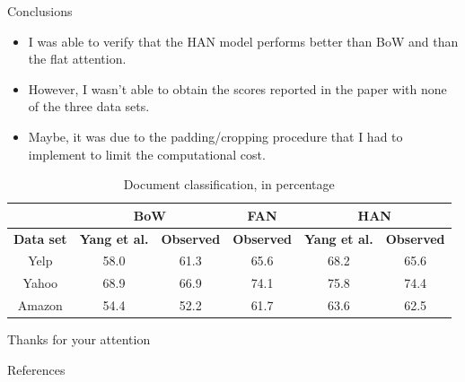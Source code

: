 \documentclass[10pt]{beamer}
\begin{document}
\begin{frame}{Conclusions}

\begin{itemize}
\item
I was able to verify that the HAN model performs better than BoW and than the flat attention.
\item
However, I wasn't able to obtain the scores reported in the paper with none of the three data sets.
\item
Maybe, it was due to the padding/cropping procedure that I had to implement to limit the computational cost.
\end{itemize}

\footnotesize{

\begin{table}[]
\begin{tabular}{c|c|c|c|c|c|}
\cline{2-6}
                       & \multicolumn{2}{c|}{\textbf{BoW}} & \textbf{FAN} & \multicolumn{2}{c|}{\textbf{HAN}} \\
\hline
\multicolumn{1}{|c|}{\textbf{Data set}} & \textbf{Yang et al. \cite{yang2016hierarchical}} & \textbf{Observed} & \textbf{Observed} & \textbf{Yang et al. \cite{yang2016hierarchical}} & \textbf{Observed} \\
\hline
\multicolumn{1}{|c|}{Yelp} & 58.0 & 61.3 & 65.6 & 68.2 & 65.6 \\
\hline
\multicolumn{1}{|c|}{Yahoo} & 68.9 & 66.9 & 74.1 & 75.8 & 74.4 \\
\hline
\multicolumn{1}{|c|}{Amazon} & 54.4 & 52.2 & 61.7 & 63.6 & 62.5 \\
\hline
\end{tabular}
\caption{\small{Document classification, in percentage}}
\end{table}

}

\end{frame}



\begin{frame}

\begin{center}
\LARGE
Thanks for your attention
\end{center}

\end{frame}


\begin{frame}[allowframebreaks]{References}




\end{frame}
\end{document}
